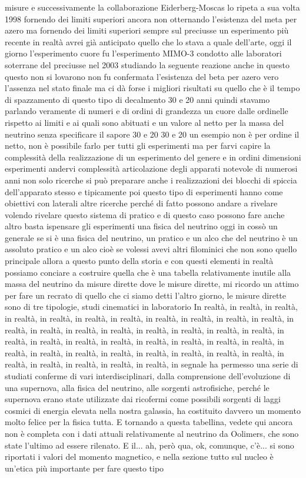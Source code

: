 misure e successivamente la collaborazione Eiderberg-Moscas lo ripeta a sua volta 1998 fornendo dei limiti superiori ancora non otternando l'esistenza del meta per azero ma fornendo dei limiti superiori sempre sul preciusse un esperimento più recente in realtà avrei già anticipato quello che lo stava a quale dell'arte, oggi il giorno l'esperimento cuore fu l'esperimento MIMO-3 condotto alle laboratori soterrane del preciusse nel 2003 studiando la seguente reazione anche in questo questo non si lovarono non fu confermata l'esistenza del beta per azero vero l'assenza nel stato finale ma ci dà forse i migliori risultati su quello che è il tempo di spazzamento di questo tipo di decalmento 30 e 20 anni quindi stavamo parlando veramente di numeri e di ordini di grandezza un cuore dalle ordinelle rispetto ai limiti e ai quali sono abituati e un valore al netto per la massa del neutrino senza specificare il sapore 30 e 20 30 e 20 un esempio non è per ordine il netto, non è possibile farlo per tutti gli esperimenti ma per farvi capire la complessità della realizzazione di un esperimento del genere e in ordini dimensioni esperimenti andervi complessità articolazione degli apparati notevole di numerosi anni non solo ricerche si può preparare anche i realizzazioni dei blocchi di spiccia dell'apparato stesso e tipicamente poi questo tipo di esperimenti hanno come obiettivi con laterali altre ricerche perché di fatto possono andare a rivelare volendo rivelare questo sistema di pratico e di questo caso possono fare anche altro basta ispensare gli esperimenti una fisica del neutrino oggi in cossò un generale se si è una fisica del neutrino, un pratico e un alco che del neutrino è un assoluto pratico e un alco cioè se volessi avevi altri filominici che non sono quello principale allora a questo punto della storia e con questi elementi in realtà possiamo conciare a costruire quella che è una tabella relativamente inutile alla massa del neutrino da misure dirette dove le misure dirette, mi ricordo un attimo per fare un recrato di quello che ci siamo detti l'altro giorno, le misure dirette sono di tre tipologie, studi cinematici in laboratorio In realtà, in realtà, in realtà, in realtà, in realtà, in realtà, in realtà, in realtà, in realtà, in realtà, in realtà, in realtà, in realtà, in realtà, in realtà, in realtà, in realtà, in realtà, in realtà, in realtà, in realtà, in realtà, in realtà, in realtà, in realtà, in realtà, in realtà, in realtà, in realtà, in realtà, in realtà, in realtà, in realtà, in realtà, in realtà, in realtà, in realtà, in realtà, in realtà, in realtà, in segnale ha permesso una serie di studiati conferme di vari interdisciplinari, dalla comprensione dell'evoluzione di una supernova, alla fisica del neutrino, alle sorgenti astrofisiche, perché le supernova erano state utilizzate dai ricofermi come possibili sorgenti di laggi cosmici di energia elevata nella nostra galassia, ha costituito davvero un momento molto felice per la fisica tutta. E tornando a questa tabellina, vedete qui ancora non è completa con i dati attuali relativamente al neutrino da Oolimers, che sono state l'ultimo ad essere rilenato. E il... ah, però qua, ok, comunque, c'è... si sono riportati i valori del momento magnetico, e nella sezione tutto sul nucleo è un'etica più importante per fare questo tipo 